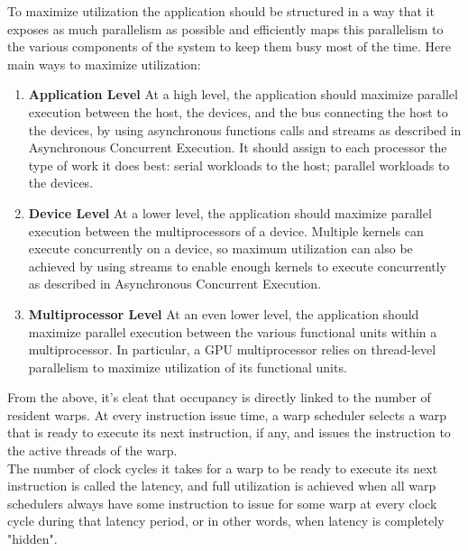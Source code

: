 	To maximize utilization the application should be structured in a way that it exposes
	as much parallelism as possible and efficiently maps this parallelism to the various
	components of the system to keep them busy most of the time.
	Here main ways to maximize utilization:
	\begin{enumerate}
			\item \textbf{Application Level}
			At a high level, the application should maximize parallel execution between the host, the
			devices, and the bus connecting the host to the devices, by using asynchronous functions
			calls and streams as described in Asynchronous Concurrent Execution. It should assign
			to each processor the type of work it does best: serial workloads to the host; parallel
			workloads to the devices.
			
			
			\item \textbf{Device Level}
			At a lower level, the application should maximize parallel execution between the multiprocessors of a device.
			Multiple kernels can execute concurrently on a device, so maximum utilization can also be achieved by using streams to enable enough kernels to execute concurrently as described in Asynchronous Concurrent Execution.
			
			
			\item \textbf{Multiprocessor Level}
			At an even lower level, the application should maximize parallel execution between the	various functional units within a multiprocessor.
			In particular, a GPU multiprocessor relies on thread-level parallelism to maximize utilization of its functional units. 
	\end{enumerate}
	
	From the above, it's cleat that occupancy is directly linked to the number of resident warps. At every instruction issue time, a warp scheduler selects a warp that is ready to execute its next instruction, if any, and issues the instruction to the active threads of the warp.\\
	The number of clock cycles it takes for a warp to be ready to execute its next instruction is called the latency, and full utilization is achieved when all warp schedulers always have some instruction to issue for some warp at every clock cycle during that latency period, or in other words,	when latency is completely "hidden". 
	
